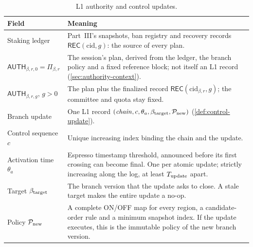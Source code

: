 \documentclass[11pt,a4paper]{article}
\newcommand{\tagg}[1]{\ensuremath{\mathsf{#1}}}
\begin{document}
\begin{table}[htbp]\centering\small
\caption{L1 authority and control updates.}\label{tab:l1}
\begin{tabularx}{\linewidth}{@{}p{.27\linewidth}Y@{}}\toprule
Field & Meaning\\\midrule
Staking ledger & Part~III's snapshots, ban registry and recovery records
$\tagg{REC}(\mathrm{cid},g)$: the source of every plan.\\
$\tagg{AUTH}_{\beta,r,0}=\Pi_{\beta,r}$ & The session's plan, derived from
the ledger, the branch policy and a fixed reference block; not itself an
L1 record (\cref{sec:authority-context}).\\
$\tagg{AUTH}_{\beta,r,g}$, $g>0$ & The plan plus the finalized record
$\tagg{REC}(\mathrm{cid}_{\beta,r},g)$; the committee and quota stay fixed.\\
Branch update & One L1 record
$(\mathit{chain},c,\theta_a,\beta_{\rm target},\mathcal P_{\rm new})$
(\cref{def:control-update}).\\
Control sequence $c$ & Unique increasing index binding the chain and the
update.\\
Activation time $\theta_a$ & Espresso timestamp threshold, announced
before its first crossing can become final. One per atomic update;
strictly increasing along the log, at least
$T_{\rm update}$ apart.\\
Target $\beta_{\rm target}$ & The branch version that the update asks to
close. A stale target makes the entire update a no-op.\\
Policy $\mathcal P_{\rm new}$ & A complete ON/OFF map for every region,
a candidate-order rule and a minimum snapshot index. If the update
executes, this is the immutable policy of the new branch version.\\\bottomrule
\end{tabularx}
\end{table}
\end{document}
